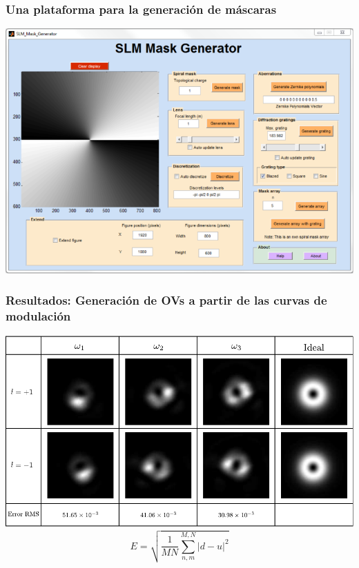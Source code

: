 \documentclass[serif,8pt]{beamer}
\begin{document}
		\begin{frame}
		\frametitle{Una plataforma para la generación de máscaras}
		\begin{center}
		\hspace*{-15pt}\includegraphics[scale=0.4]{img/maskgen.png}
		\end{center}
		\end{frame}				
		
		\begin{frame}
		\frametitle{Resultados: Generación de OVs a partir de las curvas de modulación}
		\includegraphics[scale=0.65]{img/ovcurvas.pdf}\\
		$$E = \sqrt{\frac{1}{MN} \sum\limits_{n,m}^{M,N} |d-u|^2}$$
		\end{frame}
		
		
\end{document}
